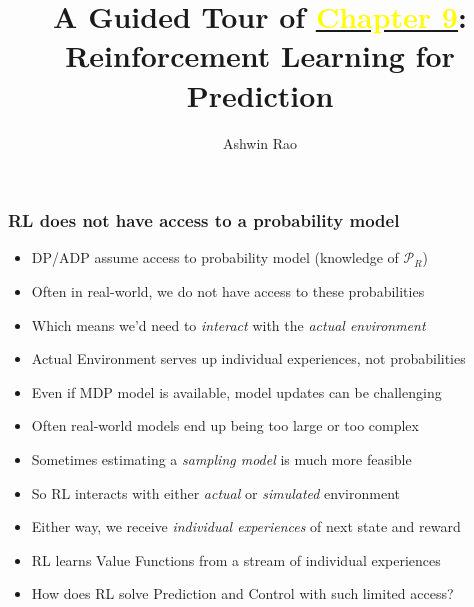 \documentclass[handout]{beamer}
\title[RL Prediction Chapter]{A Guided Tour of \href{http://stanford.edu/~ashlearn/RLForFinanceBook/book.pdf}{\underline{\textcolor{yellow}{Chapter 9}}}: \\ Reinforcement Learning for Prediction} %
\author{Ashwin Rao} %
\institute[Stanford] %
{ICME, Stanford University
}
\date %
\begin{document}
\lstset{language=Python}  
\begin{frame}
\titlepage %
\end{frame}


\begin{frame}
\frametitle{RL does not have access to a probability model}
\begin{itemize}[<+->]
\item DP/ADP assume access to probability model (knowledge of $\mathcal{P}_R$)
\item Often in real-world, we do not have access to these probabilities
\item Which means we'd need to {\em interact} with the {\em actual environment}
\item {Actual Environment} serves up individual experiences, not probabilities
\item Even if MDP model is available, model updates can be challenging
\item Often real-world models end up being too large or too complex
\item Sometimes estimating a {\em sampling model} is much more feasible
\item So RL interacts with either {\em actual} or {\em simulated} environment
\item Either way, we receive {\em individual experiences} of next state and reward
\item RL learns Value Functions from a stream of individual experiences
\item How does RL solve Prediction and Control with such limited access?
 \end{itemize}
\end{frame}
\end{document}
